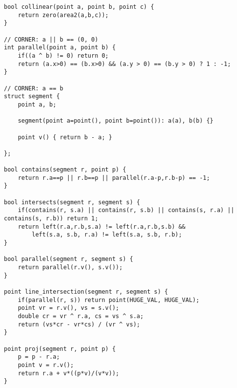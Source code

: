 \documentclass{article}
\begin{document}
\begin{verbatim}
bool collinear(point a, point b, point c) {
	return zero(area2(a,b,c));
}

// CORNER: a || b == (0, 0)
int parallel(point a, point b) {
	if((a ^ b) != 0) return 0;
	return (a.x>0) == (b.x>0) && (a.y > 0) == (b.y > 0) ? 1 : -1;
}

// CORNER: a == b
struct segment {
	point a, b;

	segment(point a=point(), point b=point()): a(a), b(b) {}

	point v() { return b - a; }

};

bool contains(segment r, point p) {
	return r.a==p || r.b==p || parallel(r.a-p,r.b-p) == -1;
}

bool intersects(segment r, segment s) {
	if(contains(r, s.a) || contains(r, s.b) || contains(s, r.a) || contains(s, r.b)) return 1;
	return left(r.a,r.b,s.a) != left(r.a,r.b,s.b) && 
		left(s.a, s.b, r.a) != left(s.a, s.b, r.b);
}

bool parallel(segment r, segment s) {
	return parallel(r.v(), s.v());
}

point line_intersection(segment r, segment s) {
	if(parallel(r, s)) return point(HUGE_VAL, HUGE_VAL);
	point vr = r.v(), vs = s.v();
	double cr = vr ^ r.a, cs = vs ^ s.a;
	return (vs*cr - vr*cs) / (vr ^ vs);
}

point proj(segment r, point p) {
	p = p - r.a;
	point v = r.v();
	return r.a + v*((p*v)/(v*v));
}
\end{verbatim}
\end{document}
